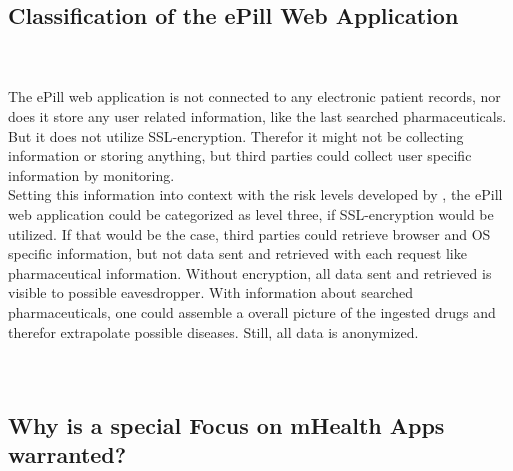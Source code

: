 \subsection{Classification of the ePill Web Application}
\\
\\
The ePill web application is not connected to any electronic patient records, nor does it store any user related information, like the last searched pharmaceuticals. But it does not utilize SSL-encryption. Therefor it might not be collecting information or storing anything, but third parties could collect user specific information by monitoring.
\\
Setting this information into context with the risk levels developed by \cite{Njie.2013}, the ePill web application could be categorized as level three, if SSL-encryption would be utilized. If that would be the case, third parties could retrieve browser and OS specific information, but not data sent and retrieved with each request like pharmaceutical information. Without encryption, all data sent and retrieved is visible to possible eavesdropper. With information about searched pharmaceuticals, one could assemble a overall picture of the ingested drugs and therefor extrapolate possible diseases. Still, all data is anonymized.
\\
\\
\\

\subsection{Why is a special Focus on mHealth Apps warranted?}